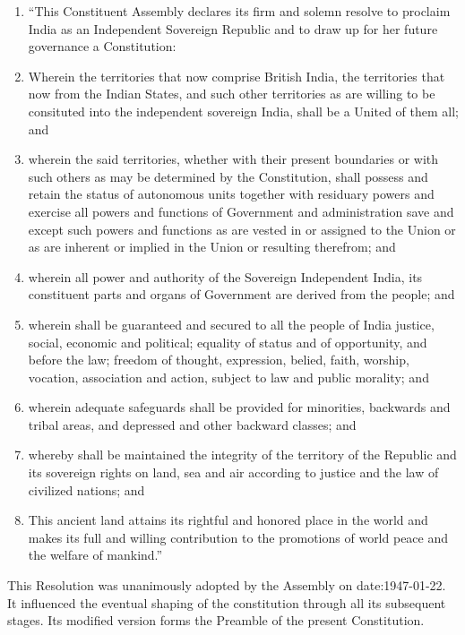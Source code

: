 \begin{enumerate}
  \item \textquotedblleft This Constituent Assembly declares its firm and solemn resolve to proclaim India as an Independent Sovereign Republic and to draw up for her future governance a Constitution:
  \item Wherein the territories that now comprise British India, the territories that now from the Indian States, and such other territories as are willing to be consituted into the independent sovereign India, shall be a United of them all; and
  \item wherein the said territories, whether with their present boundaries or with such others as may be determined by the Constitution, shall possess and retain the status of autonomous units together with residuary powers and exercise all powers and functions of Government and administration save and except such powers and functions as are vested in or assigned to the Union or as are inherent or implied in the Union or resulting therefrom; and
  \item wherein all power and authority of the Sovereign Independent India, its constituent parts and organs of Government are derived from the people; and
  \item wherein shall be guaranteed and secured to all the people of India justice, social, economic and political; equality of status and of opportunity, and before the law; freedom of thought, expression, belied, faith, worship, vocation, association and action, subject to law and public morality; and
  \item wherein adequate safeguards shall be provided for minorities, backwards and tribal areas, and depressed and other backward classes; and
  \item whereby shall be maintained the integrity of the territory of the Republic and its sovereign rights on land, sea and air according to justice and the law of civilized nations; and
  \item This ancient land attains its rightful and honored place in the world and makes its full and willing contribution to the promotions of world peace and the welfare of mankind.\textquotedblright

\end{enumerate}

This Resolution was unanimously adopted by the Assembly on \gls{date:1947-01-22}. It influenced the eventual shaping of the constitution through all its subsequent stages. Its modified version forms the Preamble of the present Constitution.

